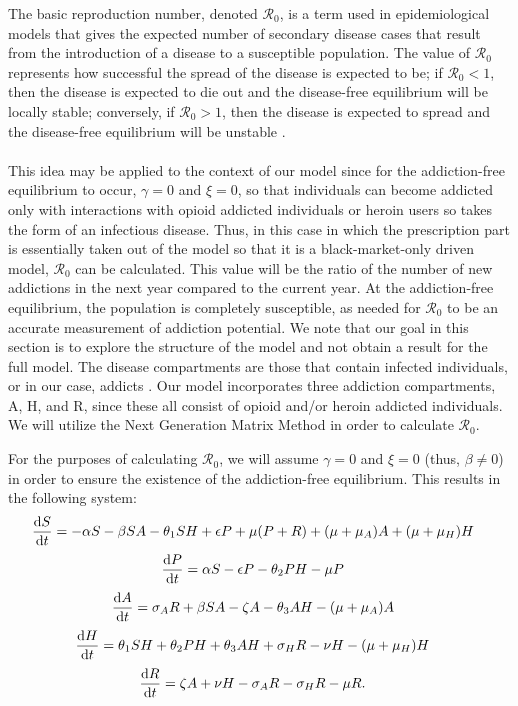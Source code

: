 \documentclass[12pt]{article}
\begin{document}
The basic reproduction number, denoted $\mathscr{R}_0$, is a term used in epidemiological models that gives the expected number of secondary disease cases that result from the introduction of a disease to a susceptible population. The value of $\mathscr{R}_0$ represents how successful the spread of the disease is expected to be; if $\mathscr{R}_0 < 1$, then the disease is expected to die out and the disease-free equilibrium will be locally stable; conversely, if $\mathscr{R}_0 >1$, then the disease is expected to spread and the disease-free equilibrium will be unstable \cite{Driessche}. \\ \\
 This idea may be applied to the context of our model since for the addiction-free equilibrium to occur, $\gamma=0$ and $\xi=0$, so that individuals can become addicted only with interactions with opioid addicted individuals or heroin users so takes the form of an infectious disease. Thus, in this case in which the prescription part is essentially taken out of the model so that it is a black-market-only driven model, $\mathscr{R}_0$ can be calculated. This value will be the ratio of the number of new addictions in the next year compared to the current year. At the addiction-free equilibrium, the population is completely susceptible, as needed for $\mathscr{R}_0$ to be an accurate measurement of addiction potential. 
We note that our goal in this section is to explore the structure of the model and not obtain a result for the full model. The disease compartments are those that contain infected individuals, or in our case, addicts \cite{Driessche}. Our model incorporates three addiction compartments, A, H, and R, since these all consist of opioid and/or heroin addicted individuals. We will utilize the Next Generation Matrix Method in order to calculate $\mathscr{R}_0$.


For the purposes of calculating $\mathscr{R}_0$, we will assume $\gamma =0$ and $\xi =0$ (thus, $\beta \neq 0$) in order to ensure the existence of the addiction-free equilibrium. This results in the following system:
\[\dv{S}{t} = -\alpha S - \beta SA  - \theta_{1} SH +\epsilon P +\mu (P+R) + (\mu+\mu_{A})A + (\mu+\mu_{H}) H \quad \] 
\[\dv{P}{t} = \alpha S - \epsilon P  - \theta_{2}PH- \mu P    \quad\]
\[\dv{A}{t} = \sigma_{A} R +\beta SA  -\zeta A - \theta_{3}AH-(\mu + \mu_{A})A   \quad\]
\[\dv{H}{t} = \theta_{1}SH+\theta_{2}PH+\theta_{3}AH + \sigma_{H}R-\nu H-(\mu+\mu_{H})H  \quad\]
\[\dv{R}{t} = \zeta A +\nu H -\sigma_{A}R-\sigma_{H}R -\mu R.\quad\]
\end{document}
